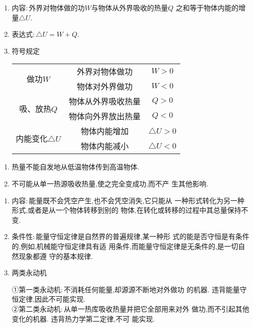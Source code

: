 
\begin{enumerate}
\renewcommand{\labelenumii}{(\arabic{enumii})}

\item 
内容$ : $外界对物体做的功$ W $与物体从外界吸收的热量$ Q $
之和等于物体内能的增量$ \triangle U $.

\item 
表达式$ : \triangle U=W+Q $.

\item 
符号规定
\begin{table}[h!]
\centering 
\begin{tabular}{|c|c|c|}
\hline 
\multirow{2}{*}{做功$ W $} & 外界对物体做功 &$ W>0 $
\\
\cline{2-3}
& 物体对外界做功 &$ W<0 $
\\
\hline
\multirow{2}{*}{吸、放热$ Q $ }& 物体从外界吸收热量 &$ Q>0 $
\\
\cline{2-3}
& 物体向外界放出热量 &$ Q<0 $
\\
\hline
\multirow{2}{*}{内能变化$ \triangle U $} & 物体内能增加 &$ \triangle U>0 $
\\
\cline{2-3}
& 物体内能减小 &$ \triangle U<0 $
\\
\hline
\end{tabular}
\end{table} 



\end{enumerate}

\begin{enumerate}
\renewcommand{\labelenumii}{(\arabic{enumii})}

\item 
热量不能自发地从低温物体传到高温物体.

\item 
不可能从单一热源吸收热量,使之完全变成功,而不产
生其他影响.

\end{enumerate}



\begin{enumerate}
\renewcommand{\labelenumii}{(\arabic{enumii})}

\item 
内容$ : $能量既不会凭空产生,也不会凭空消失,它只能从
一种形式转化为另一种形式,或者是从一个物体转移到别的
物体,在转化或转移的过程中其总量保持不变.

\item 
条件性$ : $能量守恒定律是自然界的普遍规律,某一种形
式的能是否守恒是有条件的,例如,机械能守恒定律具有适
用条件,而能量守恒定律是无条件的,是一切自然现象都遵
守的基本规律.

\item 
两类永动机

①第一类永动机$ : $不消耗任何能量,却源源不断地对外做功
的机器. 违背能量守恒定律,因此不可能实现.\\
②第二类永动机$ : $从单一热库吸收热量并把它全部用来对外
做功,而不引起其他变化的机器. 违背热力学第二定律,不可
能实现.			

\end{enumerate}


